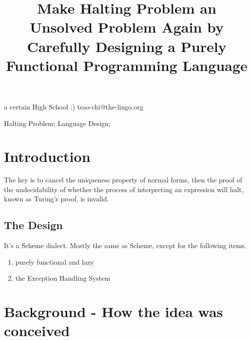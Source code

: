 \documentclass[10pt,preprint,numbers]{sigplanconf}
\begin{document}

\title{Make Halting Problem an Unsolved Problem Again by Carefully Designing a Purely Functional Programming Language}

           {a certain High School :)}
           {tsao-chi@the-lingo.org}

\maketitle



{\footnotesize
{}
\keywords
Halting Problem; Language Design;
}


\section{Introduction}

The key is to cancel the uniqueness property of normal forms, then the proof of the undecidability of whether the process of interpreting an expression will halt, known as Turing's proof, is invalid.~\citep{halt}

\subsection{The Design}

It's a Scheme dialect. Mostly the same as Scheme, except for the following items.

\begin{enumerate}
\item purely functional and lazy
\item the Exception Handling System
\end{enumerate}

\section{Background - How the idea was conceived}
\end{document}
